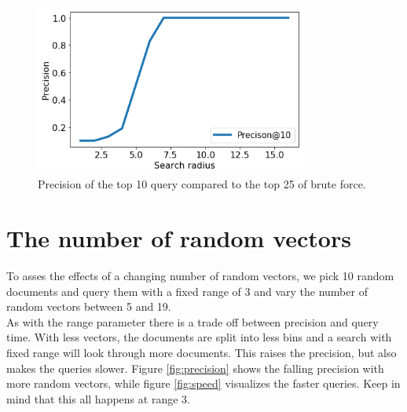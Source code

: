 \documentclass[12pt]{scrreprt}
\begin{document}
\begin{figure}[H]
  \begin{center}
    \caption{Precision of the top 10 query compared to the top 25 of brute force.}
    \label{fig:accuracy_93}
    \includegraphics[width=0.8\textwidth, angle=0]{output/output_103_1.png}
  \end{center}
\end{figure}

\section{The number of random vectors}
\label{sec:vectors}
To asses the effects of a changing number of random vectors, we pick 10 random documents and query them with a fixed range of 3 and vary the number of random vectors between 5 and 19.\\

As with the range parameter there is a trade off between precision and query time. With less vectors, the documents are split into less bins and a search with fixed range will look through more documents. This raises the precision, but also makes the queries slower. Figure \ref{fig:precision} shows the falling precision with more random vectors, while figure \ref{fig:speed} visualizes the faster queries. Keep in mind that this all happens at range 3.\\
\end{document}
